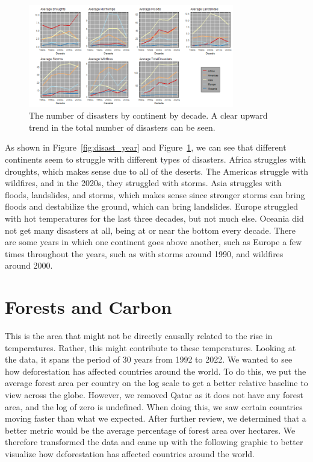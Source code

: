 \documentclass[10pt]{article}
\begin{document}
\begin{figure}[H]
    \centering
    \includegraphics[width=0.8\textwidth]{Decade_disasters.png}
    \caption{The number of disasters by continent by decade. A clear upward trend in the total number of disasters can be seen.}
    \label{fig:disast_decade}
\end{figure}
As shown in Figure~\ref{fig:disast_year} and Figure~\ref{fig:disast_decade}, we can see that different continents seem to struggle with different types of disasters. Africa struggles with droughts, which makes sense due to all of the deserts. The Americas struggle with wildfires, and in the 2020s, they struggled with storms. Asia struggles with floods, landslides, and storms, which makes sense since stronger storms can bring floods and destabilize the ground, which can bring landslides. Europe struggled with hot temperatures for the last three decades, but not much else. Oceania did not get many disasters at all, being at or near the bottom every decade. There are some years in which one continent goes above another, such as Europe a few times throughout the years, such as with storms around 1990, and wildfires around 2000.


\section{Forests and Carbon}  
\label{ForestCarbon}
This is the area that might not be directly causally related to the rise in temperatures. Rather, this might contribute to these temperatures. Looking at the data, it spans the period of 30 years from 1992 to 2022. We wanted to see how deforestation has affected countries around the world. To do this, we put the average forest area per country on the log scale to get a better relative baseline to view across the globe. However, we removed Qatar as it does not have any forest area, and the log of zero is undefined. When doing this, we saw certain countries moving faster than what we expected. After further review, we determined that a better metric would be the average percentage of forest area over hectares. We therefore transformed the data and came up with the following graphic to better visualize how deforestation has affected countries around the world.
\end{document}
